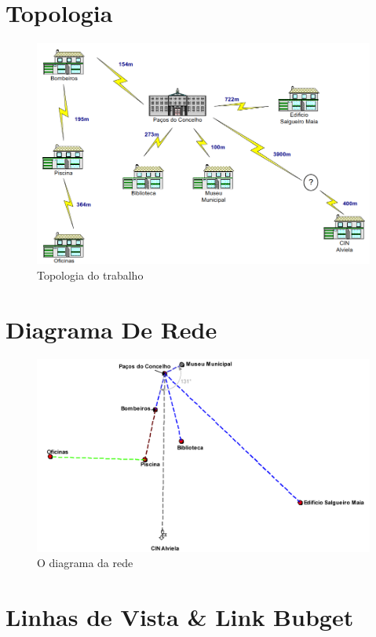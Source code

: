 \documentclass[a4paper,titlepage]{article}
\begin{document}
	\section{Topologia}
			\begin{figure}[H]
									\centering
									\includegraphics[width=\linewidth]{topologiaTP1.png}
									\caption{Topologia do trabalho}
			\end{figure}
			
	\section{Diagrama De Rede}
		\begin{figure}[H]
											\centering
											\includegraphics[width=\linewidth]{DiagramaDeRede.png}
											\caption{O diagrama da rede}
		\end{figure}
	\section{Linhas de Vista \& Link Bubget}
\end{document}
